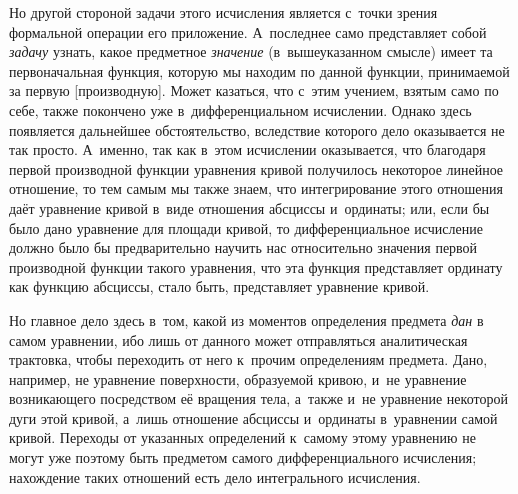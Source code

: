 Но другой стороной задачи этого исчисления является с~точки зрения формальной
операции его приложение. А~последнее само представляет собой {\em задачу}
узнать, какое предметное {\em значение} (в~вышеуказанном смысле) имеет та
первоначальная функция, которую мы находим по данной функции, принимаемой за
первую [производную]. Может казаться, что с~этим учением, взятым само по себе,
также покончено уже в~дифференциальном исчислении. Однако здесь появляется
дальнейшее обстоятельство, вследствие которого дело оказывается не так просто.
А~именно, так как в~этом исчислении оказывается, что благодаря первой
производной функции уравнения кривой получилось некоторое линейное отношение,
то тем самым мы также знаем, что интегрирование этого отношения даёт уравнение
кривой в~виде отношения абсциссы и~ординаты; или, если бы было дано уравнение
для площади кривой, то дифференциальное исчисление должно было бы
предварительно научить нас относительно значения первой производной функции
такого уравнения, что эта функция представляет ординату как функцию абсциссы,
стало быть, представляет уравнение кривой.

Но главное дело здесь в~том, какой из моментов определения предмета {\em дан}
в самом уравнении, ибо лишь от данного может отправляться аналитическая
трактовка, чтобы переходить от него к~прочим определениям предмета. Дано,
например, не уравнение поверхности, образуемой кривою, и~не уравнение
возникающего посредством её вращения тела, а~также и~не уравнение некоторой
дуги этой кривой, а~лишь отношение абсциссы и~ординаты в~уравнении самой
кривой. Переходы от указанных определений к~самому этому уравнению не могут уже
поэтому быть предметом самого дифференциального исчисления; нахождение таких
отношений есть дело интегрального исчисления.

